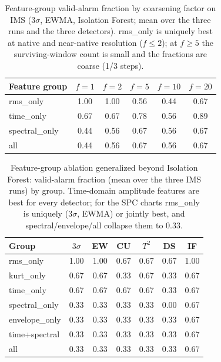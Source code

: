 \documentclass[IJPHM, 2026, 0]{PHMSociety}
\begin{document}
\begin{table}[t] \small
	\begin{center}
	\caption{Feature-group valid-alarm fraction by coarsening factor on IMS ($3\sigma$, EWMA, Isolation Forest; mean over the three runs and the three detectors). rms\_only is uniquely best at native and near-native resolution ($f\le2$); at $f \ge 5$ the surviving-window count is small and the fractions are coarse (1/3 steps).}
	\label{tab:coarsen_ablation}
	\begin{tabular}{l c c c c c}
		\hline \hline
		\textbf{Feature group} & \textbf{$f{=}1$} & \textbf{$f{=}2$} & \textbf{$f{=}5$} & \textbf{$f{=}10$} & \textbf{$f{=}20$} \\
		\hline
		rms\_only & 1.00 & 1.00 & 0.56 & 0.44 & 0.67 \\
		time\_only & 0.67 & 0.67 & 0.78 & 0.56 & 0.89 \\
		spectral\_only & 0.44 & 0.56 & 0.67 & 0.56 & 0.67 \\
		all & 0.44 & 0.56 & 0.67 & 0.56 & 0.67 \\
		\hline \hline
	\end{tabular}
	\end{center}
\end{table}

\begin{table}[t] \small
	\begin{center}
	\caption{Feature-group ablation generalized beyond Isolation Forest: valid-alarm fraction (mean over the three IMS runs) by group. Time-domain amplitude features are best for every detector; for the SPC charts rms\_only is uniquely ($3\sigma$, EWMA) or jointly best, and spectral/envelope/all collapse them to 0.33.}
	\label{tab:ablation_general}
	\begin{tabular}{l c c c c c c}
		\hline \hline
		\textbf{Group} & \textbf{$3\sigma$} & \textbf{EW} & \textbf{CU} & \textbf{$T^2$} & \textbf{DS} & \textbf{IF} \\
		\hline
		rms\_only & 1.00 & 1.00 & 0.67 & 0.67 & 0.67 & 1.00 \\
		kurt\_only & 0.67 & 0.67 & 0.33 & 0.67 & 0.33 & 0.67 \\
		time\_only & 0.67 & 0.67 & 0.67 & 0.67 & 0.33 & 0.67 \\
		spectral\_only & 0.33 & 0.33 & 0.33 & 0.33 & 0.00 & 0.67 \\
		envelope\_only & 0.33 & 0.33 & 0.33 & 0.33 & 0.33 & 0.67 \\
		time+spectral & 0.33 & 0.33 & 0.33 & 0.33 & 0.33 & 0.67 \\
		all & 0.33 & 0.33 & 0.33 & 0.33 & 0.33 & 0.67 \\
		\hline \hline
	\end{tabular}
	\end{center}
\end{table}
\end{document}
